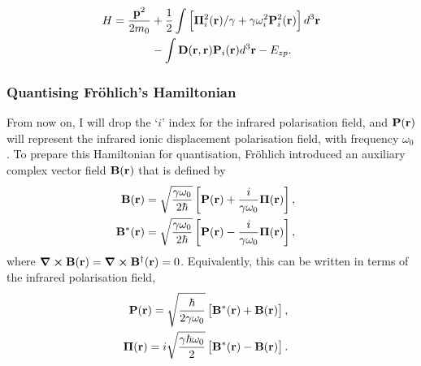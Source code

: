\begin{equation}
\begin{aligned}
    H = \frac{\vb{p}^2}{2 m_0} &+ \frac{1}{2} \int \left[\vb{\Pi}_{i}^2(\vb{r})/\gamma + \gamma\omega_{i}^2 \vb{P}^2_i (\vb{r}) \right] d^3 \vb{r} \\
    &- \int \vb{D}(\vb{r},\vb{r})\vb{P}_i(\vb{r}) d^3\vb{r} - E_{zp} .
\end{aligned}
\label{eqn-2121-16:frohlich_hamiltonian_slow}
\end{equation}

\subsubsection{Quantising Fr\"ohlich's Hamiltonian}
\label{subsubsec:2-1-2-2}

From now on, I will drop the `$i$' index for the infrared polarisation field, and $\vb{P}(\vb{r})$ will represent the infrared ionic displacement polarisation field, with frequency $\omega_0$. To prepare this Hamiltonian for quantisation, Fr\"ohlich introduced an auxiliary complex vector field $\vb{B}(\vb{r})$ that is defined by
\begin{subequations}
\begin{align}
    \begin{split}
    \vb{B}(\vb{r}) &= \sqrt{\frac{\gamma \omega_0}{2\hbar}} \left[ \vb{P}(\vb{r}) + \frac{i}{\gamma\omega_0} \vb{\Pi}(\vb{r})\right],
    \end{split}\\
    \begin{split}
    \vb{B}^*(\vb{r}) &= \sqrt{\frac{\gamma \omega_0}{2\hbar}} \left[ \vb{P}(\vb{r}) - \frac{i}{\gamma\omega_0} \vb{\Pi}(\vb{r})\right],
    \end{split}
\end{align}
\label{eqn-2133-1}
\end{subequations}
where $\curl \vb{B}(\vb{r}) = \curl \vb{B}^\dagger(\vb{r}) = 0$. Equivalently, this can be written in terms of the infrared polarisation field,
\begin{subequations}
\begin{align}
    \begin{split}
    \vb{P}(\vb{r}) &= \sqrt{\frac{\hbar}{2\gamma\omega_0}} \left[\vb{B}^*(\vb{r}) + \vb{B}(\vb{r})\right],
    \end{split}\\
    \begin{split}
    \vb{\Pi}(\vb{r}) &= i \sqrt{\frac{\gamma\hbar\omega_0}{2}} \left[\vb{B}^*(\vb{r}) - \vb{B}(\vb{r})\right].
    \end{split}
\end{align}
\label{eqn-2122-2}
\end{subequations}
